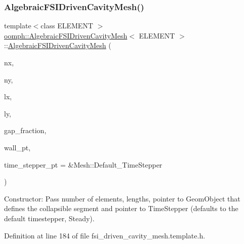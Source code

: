 \subsubsection{\texorpdfstring{Algebraic\+F\+S\+I\+Driven\+Cavity\+Mesh()}{AlgebraicFSIDrivenCavityMesh()}}
{\footnotesize\ttfamily template$<$class E\+L\+E\+M\+E\+NT $>$ \\
\hyperlink{classoomph_1_1AlgebraicFSIDrivenCavityMesh}{oomph\+::\+Algebraic\+F\+S\+I\+Driven\+Cavity\+Mesh}$<$ E\+L\+E\+M\+E\+NT $>$\+::\hyperlink{classoomph_1_1AlgebraicFSIDrivenCavityMesh}{Algebraic\+F\+S\+I\+Driven\+Cavity\+Mesh} (\begin{DoxyParamCaption}\item[{const unsigned \&}]{nx,  }\item[{const unsigned \&}]{ny,  }\item[{const double \&}]{lx,  }\item[{const double \&}]{ly,  }\item[{const double \&}]{gap\+\_\+fraction,  }\item[{Geom\+Object $\ast$}]{wall\+\_\+pt,  }\item[{Time\+Stepper $\ast$}]{time\+\_\+stepper\+\_\+pt = {\ttfamily \&Mesh\+:\+:Default\+\_\+TimeStepper} }\end{DoxyParamCaption})\hspace{0.3cm}{\ttfamily [inline]}}



Constructor\+: Pass number of elements, lengths, pointer to Geom\+Object that defines the collapsible segment and pointer to Time\+Stepper (defaults to the default timestepper, Steady). 



Definition at line 184 of file fsi\+\_\+driven\+\_\+cavity\+\_\+mesh.\+template.\+h.

\mbox{\label{classoomph_1_1AlgebraicFSIDrivenCavityMesh_a048a142aff0ca5fd62273f756bce4ab6}} 

